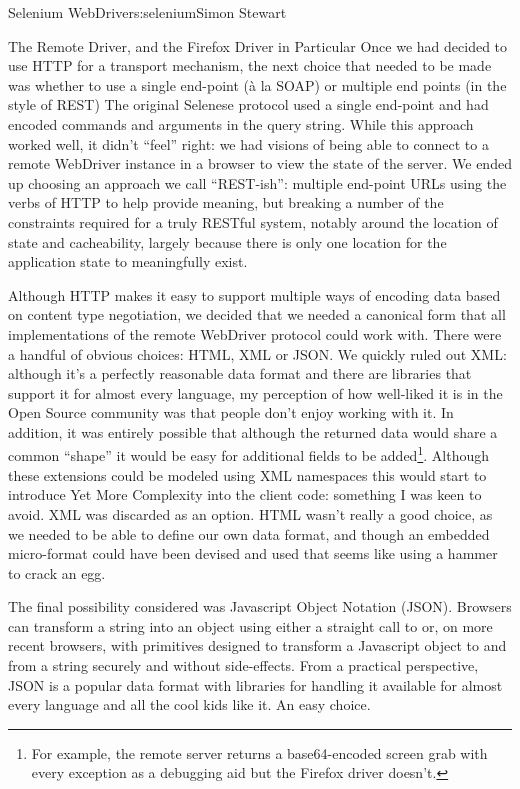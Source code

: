 \begin{aosachapter}{Selenium WebDriver}{s:selenium}{Simon Stewart}
\begin{aosasect1}{The Remote Driver, and the Firefox Driver in Particular}
Once we had decided to use HTTP for a transport mechanism, the next
choice that needed to be made was whether to use a single end-point
(\`{a} la SOAP) or multiple end points (in the style of REST) The
original Selenese protocol used a single end-point and had encoded
commands and arguments in the query string. While this approach worked
well, it didn't ``feel'' right: we had visions of being able to
connect to a remote WebDriver instance in a browser to view the state
of the server. We ended up choosing an approach we call ``REST-ish'':
multiple end-point URLs using the verbs of HTTP to help provide
meaning, but breaking a number of the constraints required for a truly
RESTful system, notably around the location of state and cacheability,
largely because there is only one location for the application state
to meaningfully exist.

Although HTTP makes it easy to support multiple ways of encoding data
based on content type negotiation, we decided that we needed a
canonical form that all implementations of the remote WebDriver
protocol could work with. There were a handful of obvious choices:
HTML, XML or JSON\@. We quickly ruled out XML: although it's a
perfectly reasonable data format and there are libraries that support
it for almost every language, my perception of how well-liked it is in
the Open Source community was that people don't enjoy working with
it. In addition, it was entirely possible that although the returned
data would share a common ``shape'' it would be easy for additional
fields to be added\footnote{For example, the remote server returns a
base64-encoded screen grab with every exception as a debugging aid
but the Firefox driver doesn't.}. Although these extensions could be
modeled using XML namespaces this would start to introduce Yet More
Complexity into the client code: something I was keen to avoid.  XML
was discarded as an option.  HTML wasn't really a good choice, as we
needed to be able to define our own data format, and though an
embedded micro-format could have been devised and used that seems like
using a hammer to crack an egg.

The final possibility considered was Javascript Object Notation
(JSON). Browsers can transform a string into an object using either a
straight call to  or, on more recent browsers, with
primitives designed to transform a Javascript object to and from a
string securely and without side-effects. From a practical
perspective, JSON is a popular data format with libraries for handling
it available for almost every language and all the cool kids like
it. An easy choice.


\end{aosasect1}
\end{aosachapter}
